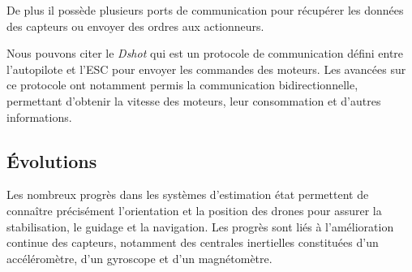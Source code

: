  De plus il possède plusieurs ports de communication pour récupérer les données des capteurs ou envoyer des ordres aux actionneurs.


 Nous pouvons citer le \textit{Dshot} qui est un protocole de communication défini entre l'autopilote et l'ESC pour envoyer les commandes des moteurs. Les avancées sur ce protocole ont notamment permis la communication bidirectionnelle, permettant d'obtenir la vitesse des moteurs, leur consommation et d'autres informations.


 \subsection{Évolutions}
 Les nombreux progrès dans les systèmes d'estimation état permettent de connaître précisément l'orientation et la position des drones pour assurer la stabilisation, le guidage et la navigation. Les progrès sont liés à l'amélioration continue des capteurs, notamment des centrales inertielles constituées d'un accéléromètre, d'un gyroscope et d'un magnétomètre.

